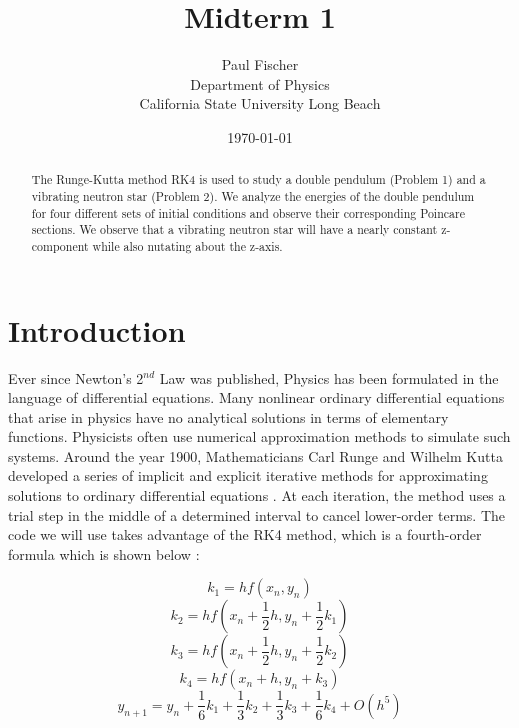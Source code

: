 \documentclass[12pt]{article}
\begin{document}

\title{Midterm 1}
\author{Paul Fischer \\
Department of Physics\\
California State University Long Beach}
\date{\today }

\maketitle

\begin{abstract}

The Runge-Kutta method RK4 is used to study a double pendulum (Problem 1) and a vibrating neutron star (Problem 2).  We analyze the energies of the double pendulum for four different sets of initial conditions and observe their corresponding Poincare sections.  We observe that a vibrating neutron star will have a nearly constant z-component while also nutating about the z-axis.

\end{abstract}

\section{Introduction}

Ever since Newton's 2$^{nd}$ Law was published, Physics has been formulated in the language of differential equations.  Many nonlinear ordinary differential equations that arise in physics have no analytical solutions in terms of elementary functions.  Physicists often use numerical approximation methods to simulate such systems.  Around the year 1900, Mathematicians Carl Runge and Wilhelm Kutta developed a series of implicit and explicit iterative methods for approximating solutions to ordinary differential equations \cite{wiki}.  At each iteration, the method uses a trial step in the middle of a determined interval to cancel lower-order terms.  The code we will use takes advantage of the RK4 method, which is a fourth-order formula which is shown below \cite{weisstein}:

\[k_1 = h f(x_n, y_n)\]
\[k_2 = h f(x_n + \frac{1}{2} h, y_n + \frac{1}{2} k_1)\]
\[k_3 = h f(x_n + \frac{1}{2} h, y_n + \frac{1}{2} k_2)\]
\[k_4 = h f(x_n + h, y_n + k_3)\]
\[y_{n+1} = y_n + \frac{1}{6} k_1 + \frac{1}{3} k_2 + \frac{1}{3} k_3 + \frac{1}{6} k_4 + O(h^5)\]
\end{document}
